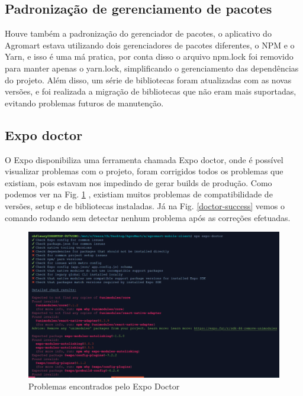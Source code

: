 \subsection{Padronização de gerenciamento de pacotes}

Houve também a padronização do gerenciador de pacotes, o aplicativo do Agromart estava utilizando dois gerenciadores de pacotes diferentes, o NPM e o Yarn, e isso é uma má pratica, por conta disso o arquivo npm.lock foi removido para manter apenas o yarn.lock, simplificando o gerenciamento das dependências do projeto. Além disso, um série de bibliotecas foram atualizadas com as novas versões, e foi realizada a migração de bibliotecas que não eram mais suportadas, evitando problemas futuros de manutenção.

\subsection{Expo doctor}

O Expo disponibiliza uma ferramenta chamada Expo doctor, onde é possível visualizar problemas com o projeto, foram corrigidos todos os problemas que existiam, pois estavam nos impedindo de gerar builds de produção. Como podemos ver na Fig. \ref{doctor-fail} , existiam muitos problemas de compatibilidade de versões, setup e de bibliotecas instaladas. Já na Fig. \ref{doctor-success} vemos o comando rodando sem detectar nenhum problema após as correções efetuadas.

\begin{figure}[h]
	\centering
	\includegraphics[keepaspectratio=true,scale=0.5]{figuras/doctor-fail.png}
	\caption{Problemas encontrados pelo Expo Doctor}
	\label{doctor-fail}
\end{figure}

